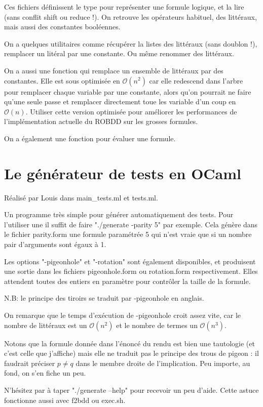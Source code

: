 \documentclass[a4paper,10pt]{article}
\begin{document}
Ces fichiers définissent le type pour représenter une formule logique, et la lire (sans conflit shift ou reduce !).
On retrouve les opérateurs habituel, des littéraux, mais aussi des constantes booléennes.

On a quelques utilitaires comme récupérer la listes des littéraux (sans doublon !), remplacer un litéral par une constante. Ou même renommer des littéraux. 

On a aussi une fonction qui remplace un ensemble de littéraux par des constantes. Elle est sous optimisée en $\mathcal{O}(n^2)$ car elle redescend dans l'arbre pour remplacer chaque variable par une constante, alors qu'on pourrait ne faire qu'une seule passe et remplacer directement toue les variable d'un coup en $\mathcal{O}(n)$. Utiliser cette version optimisée pour améliorer les performances de l'implémentation actuelle du ROBDD sur les grosses formules.

On a également une fonction pour évaluer une formule.

\section{Le générateur de tests en OCaml}
Réalisé par Louis dans main\_tests.ml et tests.ml.

Un programme très simple pour générer automatiquement des tests.
Pour l'utiliser une il suffit de faire "./generate -parity 5" par exemple. Cela génère dans le fichier parity.form une formule paramétrée 5 qui n'est vraie que si un nombre pair d'arguments sont égaux à 1.

Les options "-pigeonhole" et "-rotation" sont également disponibles, et produisent une sortie dans les fichiers pigeonhole.form ou rotation.form respectivement. Elles attendent toutes des entiers en paramètre pour contrôler la taille de la formule.

N.B: le principe des tiroirs se traduit par -pigeonhole en anglais.  

On remarque que le temps d'exécution de -pigeonhole croit assez vite, car le nombre de littéraux est un $\mathcal{O}(n^2)$ et le nombre de termes un $\mathcal{O}(n^3)$.  
  
Notons que la formule donnée dans l'énoncé du rendu est bien une tautologie (et c'est celle que j'affiche) mais elle ne traduit pas le principe des trous de pigeon : il faudrait préciser $p \neq q$ dans le membre droite de l'implication. Peu importe, au fond, on s'en fiche un peu.

N'hésitez par à taper "./generate --help" pour recevoir un peu d'aide. Cette astuce fonctionne aussi avec f2bdd ou exec.sh.
\end{document}
